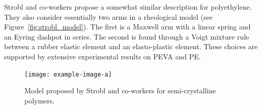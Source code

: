 Strobl and co-workers \citep{hongModelTreatingTensile2004, hongModelTreatmentTensile2004, naViscousForceDominatedTensileDeformation2006} propose a somewhat similar description for polyethylene.
They also consider essentially two arms in a rheological model (see Figure~\eqref{fig:strobl_model}).
The first is a Maxwell arm with a linear spring and an Eyring dashpot in series.
The second is found through a Voigt mixture rule between a rubber elastic element and an elasto-plastic element.
These choices are supported by extensive experimental results on PEVA and PE.
\begin{figure}
	\centering
	\texttt{[image: example-image-a]}
	\caption{Model proposed by Strobl and co-workers \citep{hongModelTreatingTensile2004, hongModelTreatmentTensile2004, naViscousForceDominatedTensileDeformation2006} for semi-crystalline polymers.}
\label{fig:strobl_model}
\end{figure}

